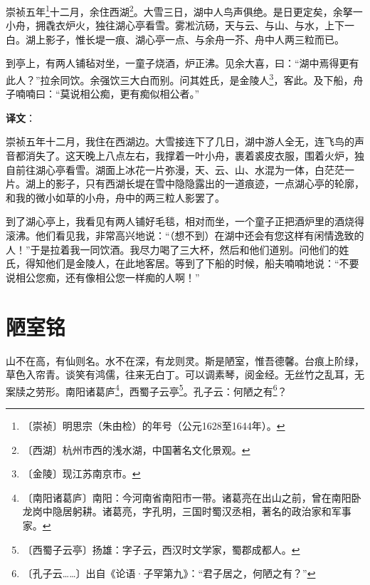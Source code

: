 \documentclass[12pt,UTF-8,openany,a4]{ctexbook}
\begin{document}
\begin{large}
    
    崇祯五年\footnote{〔崇祯〕\yiwen 明思宗（朱由检）的年号（公元1628至1644年）。}十二月，余住西湖\footnote{〔西湖〕\yiwen 杭州市西的浅水湖，中国著名文化景观。}。大雪三日，湖中人鸟声俱绝。是日更定矣，余拏一小舟，拥毳衣炉火，独往湖心亭看雪。雾凇沆砀，天与云、与山、与水，上下一白。湖上影子，惟长堤一痕、湖心亭一点、与余舟一芥、舟中人两三粒而已。
    
    到亭上，有两人铺毡对坐，一童子烧酒，炉正沸。见余大喜，曰：“湖中焉得更有此人？”拉余同饮。余强饮三大白而别。问其姓氏，是金陵人\footnote{〔金陵〕\yiwen 现江苏南京市。}，客此。及下船，舟子喃喃曰：“莫说相公痴，更有痴似相公者。”

\end{large}


\newpage

\begin{Large}
   \noindent \textbf{译文}：
\end{Large}

\vspace{1em}

\begin{large}\yiwen
    
    崇祯五年十二月，我住在西湖边。大雪接连下了几日，湖中游人全无，连飞鸟的声音都消失了。这天晚上八点左右，我撑着一叶小舟，裹着裘皮衣服，围着火炉，独自前往湖心亭看雪。湖面上冰花一片弥漫，天、云、山、水混为一体，白茫茫一片。湖上的影子，只有西湖长堤在雪中隐隐露出的一道痕迹，一点湖心亭的轮廓，和我的微小如草的小舟，舟中的两三粒人影罢了。
    
    到了湖心亭上，我看见有两人铺好毛毯，相对而坐，一个童子正把酒炉里的酒烧得滚沸。他们看见我，非常高兴地说：“（想不到）在湖中还会有您这样有闲情逸致的人！”于是拉着我一同饮酒。我尽力喝了三大杯，然后和他们道别。问他们的姓氏，得知他们是金陵人，在此地客居。等到了下船的时候，船夫喃喃地说：“不要说相公您痴，还有像相公您一样痴的人啊！”
    

\end{large}



\chapter{陋室铭}

\begin{large}
    
    山不在高，有仙则名。水不在深，有龙则灵。斯是陋室，惟吾德馨。台痕上阶绿，草色入帘青。谈笑有鸿儒，往来无白丁。可以调素琴，阅金经。无丝竹之乱耳，无案牍之劳形。南阳诸葛庐\footnote{〔南阳诸葛庐〕\yiwen 南阳：今河南省南阳市一带。诸葛亮在出山之前，曾在南阳卧龙岗中隐居躬耕。诸葛亮，字孔明，三国时蜀汉丞相，著名的政治家和军事家。}，西蜀子云亭\footnote{〔西蜀子云亭〕\yiwen 扬雄：字子云，西汉时文学家，蜀郡成都人。}。孔子云：何陋之有\footnote{〔孔子云……〕\yiwen 出自《论语·子罕第九》：“君子居之，何陋之有？”}？

\end{large}
\end{document}
